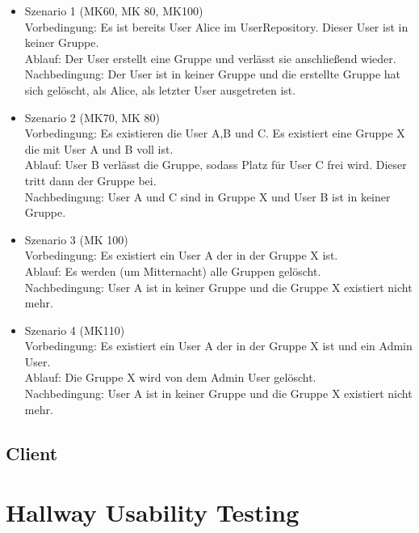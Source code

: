 \documentclass[a4paper]{scrreprt}
\begin{document}
\begin{itemize}

\item Szenario 1 (MK60, MK 80, MK100)\\
Vorbedingung: Es ist bereits User Alice im UserRepository. Dieser User ist in keiner Gruppe.\\
Ablauf: Der User erstellt eine Gruppe und verlässt sie anschließend wieder.\\
Nachbedingung: Der User ist in keiner Gruppe und die erstellte Gruppe hat sich gelöscht, als Alice, als letzter User ausgetreten ist.\\


\item Szenario 2 (MK70, MK 80)\\
Vorbedingung: Es existieren die User A,B und C. Es existiert eine Gruppe X die mit User A und B voll ist. \\
Ablauf: User B verlässt die Gruppe, sodass Platz für User C frei wird. Dieser tritt dann der Gruppe bei.\\
Nachbedingung: User A und C sind in Gruppe X und User B ist in keiner Gruppe.\\


\item Szenario 3 (MK 100)\\
Vorbedingung: Es existiert ein User A der in der Gruppe X ist.\\
Ablauf: Es werden (um Mitternacht) alle Gruppen gelöscht.\\
Nachbedingung: User A  ist in keiner Gruppe und die Gruppe X existiert nicht mehr.\\

\item Szenario 4 (MK110)\\
Vorbedingung: Es existiert ein User A der in der Gruppe X ist und ein Admin User.\\
Ablauf: Die Gruppe X wird von dem Admin User gelöscht.\\
Nachbedingung: User A  ist in keiner Gruppe und die Gruppe X existiert nicht mehr.\\


\end{itemize}



\section{Client}



\chapter{Hallway Usability Testing}

\printglossaries
\end{document}
